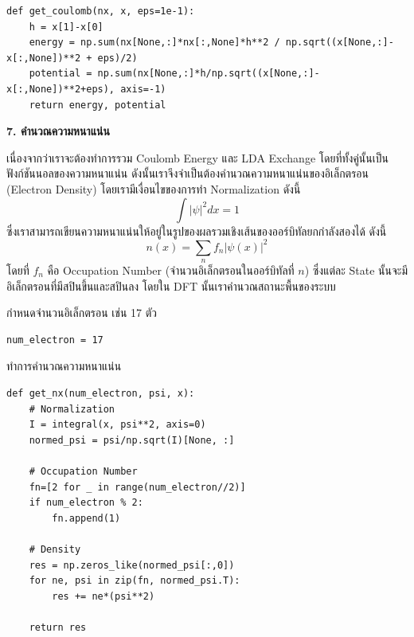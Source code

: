 \vspace{1em}
\begin{lstlisting}[style=MyPython]
def get_coulomb(nx, x, eps=1e-1):
    h = x[1]-x[0]
    energy = np.sum(nx[None,:]*nx[:,None]*h**2 / np.sqrt((x[None,:]-x[:,None])**2 + eps)/2)
    potential = np.sum(nx[None,:]*h/np.sqrt((x[None,:]-x[:,None])**2+eps), axis=-1)
    return energy, potential
\end{lstlisting}

\vspace{1em}

\noindent \textbf{7. คำนวณความหนาแน่น}

เนื่องจากว่าเราจะต้องทำการรวม Coulomb Energy และ LDA Exchange โดยที่ทั้งคู่นั้นเป็นฟังก์ชันนอลของความหนาแน่น ดังนั้นเราจึงจำเป็นต้องคำนวณความหนาแน่นของอิเล็กตรอน (Electron Density) โดยเรามีเงื่อนไขของการทำ Normalization ดังนี้
%
\begin{equation}
    \int \lvert \psi \rvert ^2 dx = 1
\end{equation}
%
\noindent ซึ่งเราสามารถเขียนความหนาแน่นให้อยู่ในรูปของผลรวมเชิงเส้นของออร์บิทัลยกกำลังสองได้ ดังนี้
%
\begin{equation}
    n(x) = \sum_n f_n \lvert \psi(x) \rvert ^2
\end{equation}
%
\noindent โดยที่ $f_n$ คือ Occupation Number (จำนวนอิเล็กตรอนในออร์บิทัลที่ $n$) ซึ่งแต่ละ State นั้นจะมีอิเล็กตรอนที่มีสปินขึ้นและสปินลง โดยใน DFT นั้นเราคำนวณสถานะพื้นของระบบ

\noindent กำหนดจำนวนอิเล็กตรอน เช่น 17 ตัว

\begin{lstlisting}[style=MyPython]
num_electron = 17
\end{lstlisting}

\vspace{1em}

\noindent ทำการคำนวณความหนาแน่น

\begin{lstlisting}[style=MyPython]
def get_nx(num_electron, psi, x):
    # Normalization
    I = integral(x, psi**2, axis=0)
    normed_psi = psi/np.sqrt(I)[None, :]
    
    # Occupation Number
    fn=[2 for _ in range(num_electron//2)]
    if num_electron % 2:
        fn.append(1)

    # Density
    res = np.zeros_like(normed_psi[:,0])
    for ne, psi in zip(fn, normed_psi.T):
        res += ne*(psi**2)

    return res
\end{lstlisting}

